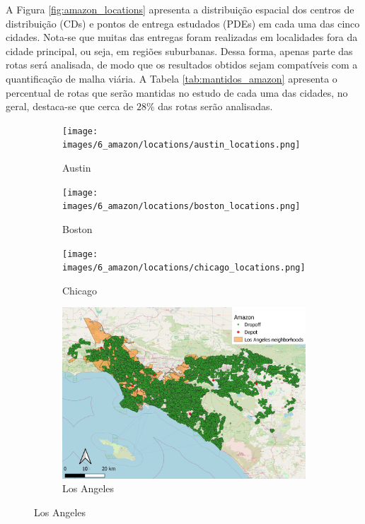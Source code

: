 A Figura \ref{fig:amazon_locations} apresenta a distribuição espacial dos centros de distribuição (CDs) e pontos de entrega estudados (PDEs) em cada uma das cinco cidades.
Nota-se que muitas das entregas foram realizadas em localidades fora da cidade principal, ou seja, em regiões suburbanas.
Dessa forma, apenas parte das rotas será analisada, de modo que os resultados obtidos sejam compatíveis com a quantificação de malha viária.
A Tabela \ref{tab:mantidos_amazon} apresenta o percentual de rotas que serão mantidas no estudo de cada uma das cidades, no geral, destaca-se que cerca de $28\%$ das rotas serão analisadas.

\begin{figure}[H]
    \centering
    \caption{Distribuição espacial das cinco operações estudadas (\textit{Amazon})}
    \label{fig:amazon_locations}
    \begin{subfigure}{.32\textwidth}
        \caption{Austin}
        \texttt{[image: images/6\_amazon/locations/austin\_locations.png]}
    \end{subfigure}
    \begin{subfigure}{.32\textwidth}
        \caption{Boston}
        \texttt{[image: images/6\_amazon/locations/boston\_locations.png]}
    \end{subfigure}
    \begin{subfigure}{.32\textwidth}
        \caption{Chicago}
        \texttt{[image: images/6\_amazon/locations/chicago\_locations.png]}
    \end{subfigure}
    \begin{subfigure}{.32\textwidth}
        \caption{Los Angeles}
        \includegraphics[width=\textwidth]{images/6_amazon/locations/los_angeles_locations.png}

\end{subfigure}
\end{figure}
